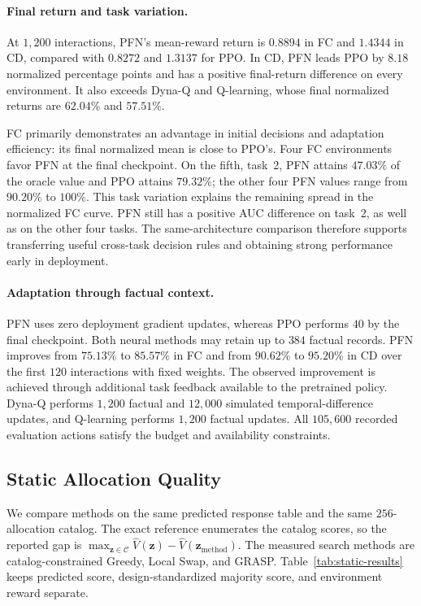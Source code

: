 \documentclass[a4paper,11pt]{article}
\numberwithin{equation}{section}
\begin{document}
\paragraph{Final return and task variation.}
At $1{,}200$ interactions, PFN's mean-reward return is $0.8894$ in FC and $1.4344$ in CD, compared with $0.8272$ and $1.3137$ for PPO. In CD, PFN leads PPO by $8.18$ normalized percentage points and has a positive final-return difference on every environment. It also exceeds Dyna-Q and Q-learning, whose final normalized returns are $62.04\%$ and $57.51\%$.

FC primarily demonstrates an advantage in initial decisions and adaptation efficiency: its final normalized mean is close to PPO's. Four FC environments favor PFN at the final checkpoint. On the fifth, task~2, PFN attains $47.03\%$ of the oracle value and PPO attains $79.32\%$; the other four PFN values range from $90.20\%$ to $100\%$. This task variation explains the remaining spread in the normalized FC curve. PFN still has a positive AUC difference on task~2, as well as on the other four tasks. The same-architecture comparison therefore supports transferring useful cross-task decision rules and obtaining strong performance early in deployment.

\paragraph{Adaptation through factual context.}
PFN uses zero deployment gradient updates, whereas PPO performs $40$ by the final checkpoint. Both neural methods may retain up to $384$ factual records. PFN improves from $75.13\%$ to $85.57\%$ in FC and from $90.62\%$ to $95.20\%$ in CD over the first $120$ interactions with fixed weights. The observed improvement is achieved through additional task feedback available to the pretrained policy. Dyna-Q performs $1{,}200$ factual and $12{,}000$ simulated temporal-difference updates, and Q-learning performs $1{,}200$ factual updates. All $105{,}600$ recorded evaluation actions satisfy the budget and availability constraints.

\FloatBarrier
\subsection{Static Allocation Quality}
\label{sec:static-results}
We compare methods on the same predicted response table and the same $256$-allocation catalog. The exact reference enumerates the catalog scores, so the reported gap is
$\max_{\mathbf z\in\mathcal C}\widehat V(\mathbf z)-\widehat V(\mathbf z_{\mathrm{method}})$.
The measured search methods are catalog-constrained Greedy, Local Swap, and GRASP. Table~\ref{tab:static-results} keeps predicted score, design-standardized majority score, and environment reward separate.
\end{document}
